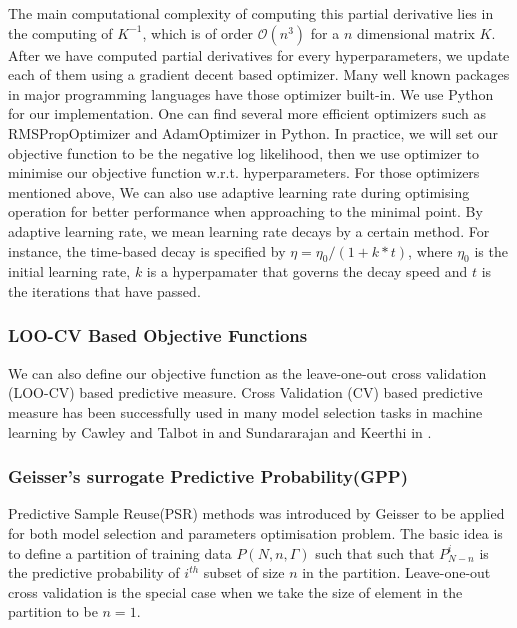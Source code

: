 \documentclass[11pt,a4paper]{article}
\theoremstyle{definition}
\numberwithin{equation}{section}
\begin{document}
	The main computational complexity of computing this partial derivative lies in the computing of $K^{-1}$, which is of order $\mathcal O(n^3)$ for a $n$ dimensional matrix $K$. After we have computed partial derivatives for every hyperparameters, we update each of them using a gradient decent based optimizer. Many well known packages in major programming languages have those optimizer built-in. We use Python for our implementation. One can find several more efficient optimizers such as RMSPropOptimizer and AdamOptimizer in Python. In practice, we will set our objective function to be the negative log likelihood, then we use optimizer to minimise our objective function w.r.t. hyperparameters. For those optimizers mentioned above, We can also use adaptive learning rate during optimising operation for better performance when approaching to the minimal point. By adaptive learning rate, we mean learning rate decays by a certain method. For instance, the time-based decay is specified by $\eta = \eta_0/(1+k*t)$, where $\eta_0$ is the initial learning rate, $k$ is a hyperpamater that governs the decay speed and $t$ is the iterations that have passed\cite[Bengio]{Bengio}.
	
	\subsubsection{LOO-CV Based Objective Functions}
	We can also define our objective function as the leave-one-out cross validation (LOO-CV) based predictive measure. Cross Validation (CV) based predictive measure has been successfully used in many model selection tasks in machine learning by Cawley and Talbot in \cite{Cawley_Talbot} and Sundararajan and Keerthi in \cite{Sundararajan_Keerthi}. 
	
	\subsubsection*{Geisser's surrogate Predictive Probability(GPP)}
	Predictive Sample Reuse(PSR) methods was introduced by Geisser\cite{Geisser} to be applied for both model selection and parameters optimisation problem. The basic idea is to define a partition of training data $P(N,n,\Gamma)$ such that such that $P_{N-n}^i$ is the predictive probability of $i^{th}$ subset of size $n$ in the partition. Leave-one-out cross validation is the special case when we take the size of element in the partition to be $n=1$.
	
\end{document}
